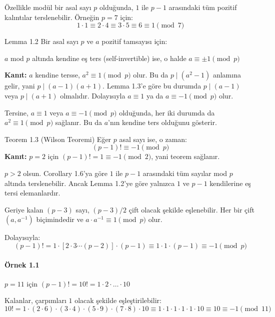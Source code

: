 Özellikle modül bir asal sayı $p$ olduğunda, $1$ ile $p-1$ arasındaki tüm pozitif kalıntılar terslenebilir.  
Örneğin $p = 7$ için:
\[
1 \cdot 1 \equiv 2 \cdot 4 \equiv 3 \cdot 5 \equiv 6 \equiv 1 \pmod{7}
\]

\begin{theorembox}{Lemma 1.2}
Bir asal sayı $p$ ve $a$ pozitif tamsayısı için:

$a$ mod $p$ altında kendine eş ters (self-invertible) ise, o halde $a \equiv \pm 1 \pmod{p}$

\textbf{Kanıt:}  
$a$ kendine tersse, $a^2 \equiv 1 \pmod{p}$ olur. Bu da $p \mid (a^2 - 1)$ anlamına gelir, yani $p \mid (a - 1)(a + 1)$. Lemma 1.3'e göre bu durumda $p \mid (a - 1)$ veya $p \mid (a + 1)$ olmalıdır. Dolayısıyla $a \equiv 1$ ya da $a \equiv -1 \pmod{p}$ olur.

Tersine, $a \equiv 1$ veya $a \equiv -1 \pmod{p}$ olduğunda, her iki durumda da $a^2 \equiv 1 \pmod{p}$ sağlanır. Bu da $a$'nın kendine ters olduğunu gösterir.
\end{theorembox}

\begin{theorembox}{Teorem 1.3 (Wilson Teoremi)}
Eğer $p$ asal sayı ise, o zaman:
\[
(p - 1)! \equiv -1 \pmod{p}
\]
\textbf{Kanıt:}  
$p = 2$ için $(p - 1)! = 1 \equiv -1 \pmod{2}$, yani teorem sağlanır.

$p > 2$ olsun. Corollary 1.6'ya göre $1$ ile $p - 1$ arasındaki tüm sayılar mod $p$ altında terslenebilir. Ancak Lemma 1.2'ye göre yalnızca $1$ ve $p - 1$ kendilerine eş tersi elemanlardır.

Geriye kalan $(p - 3)$ sayı, $(p - 3)/2$ çift olacak şekilde eşlenebilir. Her bir çift $(a, a^{-1})$ biçimindedir ve $a \cdot a^{-1} \equiv 1 \pmod{p}$ olur.

Dolayısıyla:
\[
(p - 1)! = 1 \cdot [2 \cdot 3 \cdots (p - 2)] \cdot (p - 1)
\equiv 1 \cdot 1 \cdot (p - 1) \equiv -1 \pmod{p}
\]
\end{theorembox}

\paragraph{Örnek 1.1}  
$p = 11$ için $(p - 1)! = 10! = 1 \cdot 2 \cdot \dots \cdot 10$

Kalanlar, çarpımları $1$ olacak şekilde eşleştirilebilir:
\[
10! = 1 \cdot (2 \cdot 6) \cdot (3 \cdot 4) \cdot (5 \cdot 9) \cdot (7 \cdot 8) \cdot 10
\equiv 1 \cdot 1 \cdot 1 \cdot 1 \cdot 1 \cdot 10 \equiv 10 \equiv -1 \pmod{11}
\]

